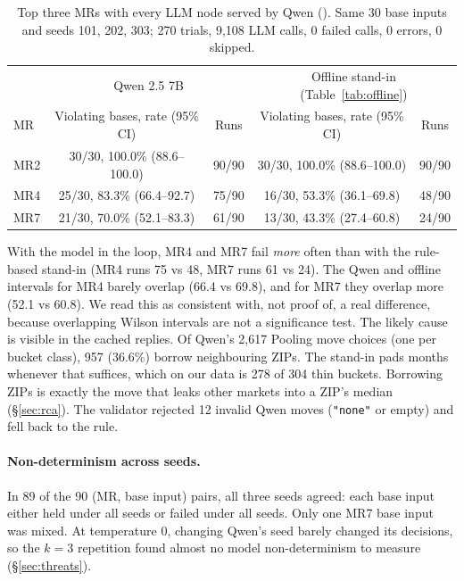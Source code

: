 \documentclass[11pt,a4paper]{article}
\newcommand{\file}[1]{\texttt{\detokenize{#1}}}
\begin{document}
\begin{table}[h]
\centering\small
\begin{tabular}{@{}lcccc@{}}
\toprule
& \multicolumn{2}{c}{Qwen 2.5 7B} & \multicolumn{2}{c}{Offline stand-in (Table~\ref{tab:offline})} \\
MR & Violating bases, rate (95\% CI) & Runs & Violating bases, rate (95\% CI) & Runs \\
\midrule
MR2 & 30/30, 100.0\% (88.6--100.0) & 90/90 & 30/30, 100.0\% (88.6--100.0) & 90/90 \\
MR4 & 25/30, 83.3\% (66.4--92.7)   & 75/90 & 16/30, 53.3\% (36.1--69.8)   & 48/90 \\
MR7 & 21/30, 70.0\% (52.1--83.3)   & 61/90 & 13/30, 43.3\% (27.4--60.8)   & 24/90 \\
\bottomrule
\end{tabular}
\caption{Top three MRs with every LLM node served by Qwen (\file{results/mr_llm/summary.md}). Same 30 base inputs and
seeds 101, 202, 303; 270 trials, 9,108 LLM calls, 0 failed calls, 0 errors, 0 skipped.}
\label{tab:qwen}
\end{table}

With the model in the loop, MR4 and MR7 fail \emph{more} often than with the rule-based stand-in (MR4 runs 75 vs 48,
MR7 runs 61 vs 24). The Qwen and offline intervals for MR4 barely overlap (66.4 vs 69.8), and for MR7 they overlap more
(52.1 vs 60.8). We read this as consistent with, not proof of, a real difference, because overlapping Wilson intervals
are not a significance test. The likely cause is visible in the cached replies. Of Qwen's 2,617 Pooling move choices
(one per bucket class), 957 (36.6\%) borrow neighbouring ZIPs. The stand-in pads months whenever that suffices, which on our
data is 278 of 304 thin buckets. Borrowing ZIPs is exactly the move that leaks other markets into a ZIP's median
(\S\ref{sec:rca}). The validator rejected 12 invalid Qwen moves (\texttt{"none"} or empty) and fell back to the rule.

\paragraph{Non-determinism across seeds.} In 89 of the 90 (MR, base input) pairs, all three seeds agreed: each base
input either held under all seeds or failed under all seeds. Only one MR7 base input was mixed. At temperature 0, changing
Qwen's seed barely changed its decisions, so the $k=3$ repetition found almost no model non-determinism to measure
(\S\ref{sec:threats}).
\end{document}
